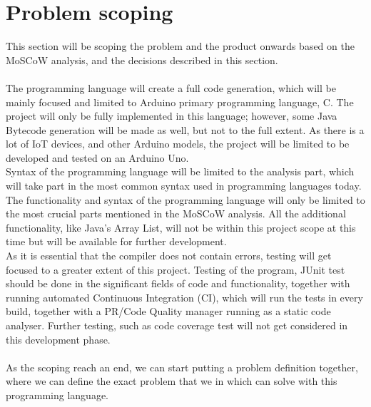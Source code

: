 \section{Problem scoping}
This section will be scoping the problem and the product onwards based on the MoSCoW analysis, and the decisions described in this section.  \\
\\
The programming language will create a full code generation, which will be mainly focused and limited to Arduino primary programming language, C. The project will only be fully implemented in this language; however, some Java Bytecode generation will be made as well, but not to the full extent. As there is a lot of IoT devices, and other Arduino models, the project will be limited to be developed and tested on an Arduino Uno.  \\
Syntax of the programming language will be limited to the analysis part, which will take part in the most common syntax used in programming languages today. The functionality and syntax of the programming language will only be limited to the most crucial parts mentioned in the MoSCoW analysis. All the additional functionality, like Java’s Array List, will not be within this project scope at this time but will be available for further development. \\
As it is essential that the compiler does not contain errors, testing will get focused to a greater extent of this project. Testing of the program, JUnit test should be done in the significant fields of code and functionality, together with running automated Continuous Integration (CI), which will run the tests in every build, together with a PR/Code Quality manager running as a static code analyser. Further testing, such as code coverage test will not get considered in this development phase.  \\


\\ 
As the scoping reach an end, we can start putting a problem definition together, where we can define the exact problem that we in which can solve with this programming language.  